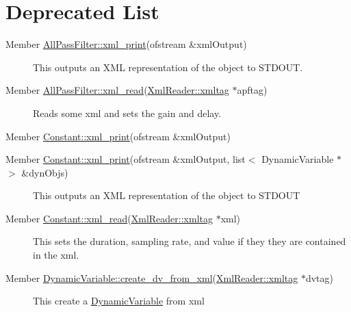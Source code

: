\hypertarget{deprecated}{}\section{Deprecated List}\label{deprecated}
\label{_deprecated000002}
\hypertarget{deprecated__deprecated000002}{}
 \begin{description}
\item[Member \hyperlink{classAllPassFilter_a4}{All\-Pass\-Filter::xml\_\-print}(ofstream \&xml\-Output) ]This outputs an XML representation of the object to STDOUT.\end{description}


\label{_deprecated000003}
\hypertarget{deprecated__deprecated000003}{}
 \begin{description}
\item[Member \hyperlink{classAllPassFilter_a8}{All\-Pass\-Filter::xml\_\-read}(\hyperlink{classXmlReader_1_1xmltag}{Xml\-Reader::xmltag} $\ast$apftag) ]Reads some xml and sets the gain and delay.\end{description}


\label{_deprecated000005}
\hypertarget{deprecated__deprecated000005}{}
 \begin{description}
\item[Member \hyperlink{classConstant_a8}{Constant::xml\_\-print}(ofstream \&xml\-Output) ]\end{description}


\label{_deprecated000004}
\hypertarget{deprecated__deprecated000004}{}
 \begin{description}
\item[Member \hyperlink{classConstant_a7}{Constant::xml\_\-print}(ofstream \&xml\-Output, list$<$ Dynamic\-Variable $\ast$ $>$ \&dyn\-Objs) ]This outputs an XML representation of the object to STDOUT \end{description}


\label{_deprecated000006}
\hypertarget{deprecated__deprecated000006}{}
 \begin{description}
\item[Member \hyperlink{classConstant_a9}{Constant::xml\_\-read}(\hyperlink{classXmlReader_1_1xmltag}{Xml\-Reader::xmltag} $\ast$xml) ]This sets the duration, sampling rate, and value if they they are contained in the xml.\end{description}


\label{_deprecated000009}
\hypertarget{deprecated__deprecated000009}{}
 \begin{description}
\item[Member \hyperlink{classDynamicVariable_e0}{Dynamic\-Variable::create\_\-dv\_\-from\_\-xml}(\hyperlink{classXmlReader_1_1xmltag}{Xml\-Reader::xmltag} $\ast$dvtag) ]This create a \hyperlink{classDynamicVariable}{Dynamic\-Variable} from xml\end{description}


